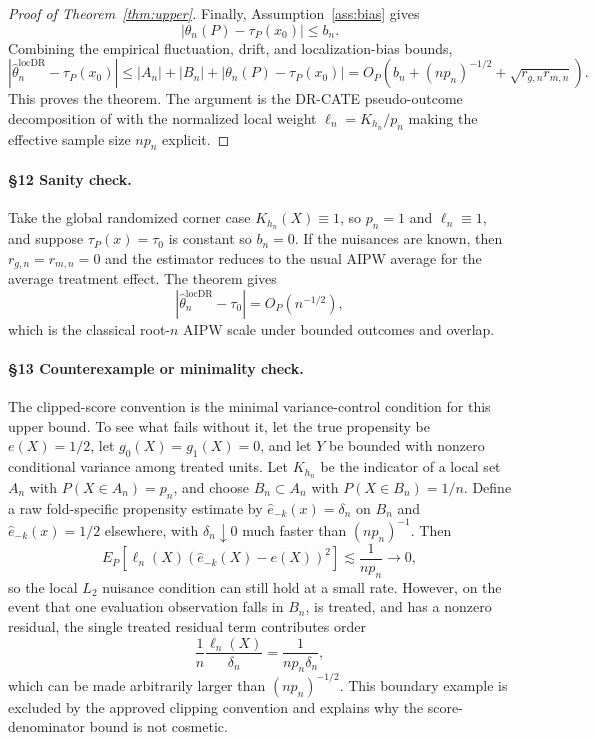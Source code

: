 \begin{proof}[Proof of Theorem~\ref{thm:upper}]
Finally, Assumption~\ref{ass:bias} gives
\[
  |\theta_n(P)-\tau_P(x_0)|\le b_n.
\]
Combining the empirical fluctuation, drift, and localization-bias bounds,
\[
  |\hat\theta_n^{\mathrm{locDR}}-\tau_P(x_0)|
  \le |A_n|+|B_n|+|\theta_n(P)-\tau_P(x_0)|
  =
  O_P\!\left(b_n+(n p_n)^{-1/2}+\sqrt{r_{g,n}r_{m,n}}\right).
\]
This proves the theorem.  The argument is the DR-CATE pseudo-outcome decomposition of
\cite{Kennedy2023DRCATE} with the normalized local weight $\ell_n=K_{h_n}/p_n$ making the effective
sample size $n p_n$ explicit.
\end{proof}

\paragraph{\S12 Sanity check.}
Take the global randomized corner case $K_{h_n}(X)\equiv1$, so $p_n=1$ and $\ell_n\equiv1$, and suppose
$\tau_P(x)=\tau_0$ is constant so $b_n=0$.  If the nuisances are known, then
$r_{g,n}=r_{m,n}=0$ and the estimator reduces to the usual AIPW average for the average treatment
effect.  The theorem gives
\[
  |\hat\theta_n^{\mathrm{locDR}}-\tau_0|=O_P(n^{-1/2}),
\]
which is the classical root-$n$ AIPW scale under bounded outcomes and overlap.

\paragraph{\S13 Counterexample or minimality check.}
The clipped-score convention is the minimal variance-control condition for this upper bound.  To see
what fails without it, let the true propensity be $e(X)=1/2$, let $g_0(X)=g_1(X)=0$, and let $Y$ be
bounded with nonzero conditional variance among treated units.  Let $K_{h_n}$ be the indicator of a
local set $A_n$ with $P(X\in A_n)=p_n$, and choose $B_n\subset A_n$ with $P(X\in B_n)=1/n$.  Define a
raw fold-specific propensity estimate by $\hat e_{-k}(x)=\delta_n$ on $B_n$ and
$\hat e_{-k}(x)=1/2$ elsewhere, with $\delta_n\downarrow0$ much faster than $(n p_n)^{-1}$.
Then
\[
  E_P[\ell_n(X)(\hat e_{-k}(X)-e(X))^2]\lesssim \frac{1}{n p_n}\to0,
\]
so the local $L_2$ nuisance condition can still hold at a small rate.  However, on the event that one
evaluation observation falls in $B_n$, is treated, and has a nonzero residual, the single treated
residual term contributes order
\[
  \frac{1}{n}\frac{\ell_n(X)}{\delta_n}
  =
  \frac{1}{n p_n\delta_n},
\]
which can be made arbitrarily larger than $(n p_n)^{-1/2}$.  This boundary example is excluded by the
approved clipping convention and explains why the score-denominator bound is not cosmetic.
